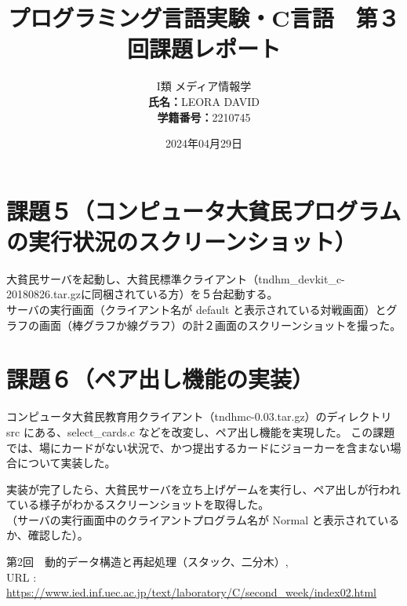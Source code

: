\documentclass[]{jsarticle}
\title{\vspace{-3cm} プログラミング言語実験・C言語　第３回課題レポート}
\author{I類 メディア情報学 \\\textbf{氏名：}LEORA DAVID\\\textbf{学籍番号：}2210745}
\date{2024年04月29日}
\begin{document}
\maketitle
\section*{課題５（コンピュータ大貧民プログラムの実行状況のスクリーンショット）}
大貧民サーバを起動し、大貧民標準クライアント（tndhm_devkit_c-20180826.tar.gzに同梱されている方）を５台起動する。\\
サーバの実行画面（クライアント名が default と表示されている対戦画面）とグラフの画面（棒グラフか線グラフ）の計２画面のスクリーンショットを撮った。\\

\section*{課題６（ペア出し機能の実装）}
コンピュータ大貧民教育用クライアント（tndhmc-0.03.tar.gz）のディレクトリ src にある、select_cards.c などを改変し、ペア出し機能を実現した。
この課題では、場にカードがない状況で、かつ提出するカードにジョーカーを含まない場合について実装した。

実装が完了したら、大貧民サーバを立ち上げゲームを実行し、ペア出しが行われている様子がわかるスクリーンショットを取得した。\\
（サーバの実行画面中のクライアントプログラム名が Normal と表示されているか、確認した）。

\newpage
\begin{thebibliography}{99}
   第2回　動的データ構造と再起処理（スタック、二分木）, \\URL : \url{https://www.ied.inf.uec.ac.jp/text/laboratory/C/second_week/index02.html}
\end{thebibliography}
\end{document}
